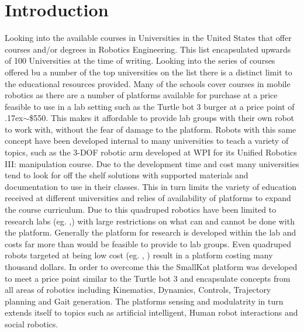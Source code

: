 \documentclass[conference]{IEEEtran}
\newcommand{\approximately}{{\raise.17ex\hbox{$\scriptstyle\mathtt{\sim}$}}}
\begin{document}
\section{Introduction}
Looking into the available courses in Universities in the United States that offer courses and/or degrees in Robotics Engineering. This list encapsulated upwards of 100 Universities at the time of writing. Looking into the series of courses offered bu a number of the top universities on the list there is a distinct limit to the educational resources provided. Many of the schools cover courses in mobile robotics as there are a number of platforms available for purchase at a price feasible to use in a lab setting such as the Turtle bot 3 burger at a price point of \approximately\$550. This makes it affordable to provide lab groups with their own robot to work with, without the fear of damage to the platform. Robots with this same concept have been developed internal to many universities to teach a variety of topics, such as the 3-DOF robotic arm developed at WPI for its Unified Robotics III: manipulation course. Due to the development time and cost many universities tend to look for off the shelf solutions with supported materials and documentation to use in their classes. This in turn limits the variety of education received at different universities and relies of availability of platforms to expand the course curriculum. Due to this quadruped robotics have been limited to research labs (eg. \cite{8593885},\cite{HyQ}) with large restrictions on what can and cannot be done with the platform. Generally the platform for research is developed within the lab and costs far more than would be feasible to provide to lab groups. Even quadruped robots targeted at being low cost (eg. \cite{8793865},  \cite{Geva2014AND}) result in a platform costing many thousand dollars.  In order to overcome this the SmallKat platform was developed to meet a price point similar to the Turtle bot 3 and encapsulate concepts from all areas of robotics including Kinematics, Dynamics, Controls, Trajectory planning and Gait generation. The platforms sensing and modulatrity in turn extends itself to topics such as artificial intelligent, Human robot interactions and social robotics. 
\end{document}
